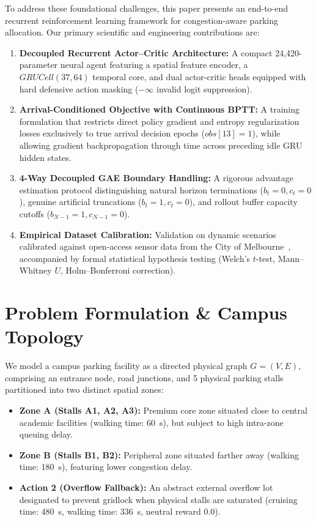 \documentclass[journal]{IEEEtran}
\begin{document}
To address these foundational challenges, this paper presents an end-to-end recurrent reinforcement learning framework for congestion-aware parking allocation. Our primary scientific and engineering contributions are:
\begin{enumerate}
    \item \textbf{Decoupled Recurrent Actor--Critic Architecture:} A compact 24,420-parameter neural agent featuring a spatial feature encoder, a $GRUCell(37, 64)$ temporal core, and dual actor-critic heads equipped with hard defensive action masking ($-\infty$ invalid logit suppression).
    \item \textbf{Arrival-Conditioned Objective with Continuous BPTT:} A training formulation that restricts direct policy gradient and entropy regularization losses exclusively to true arrival decision epochs ($obs[13] = 1$), while allowing gradient backpropagation through time across preceding idle GRU hidden states.
    \item \textbf{4-Way Decoupled GAE Boundary Handling:} A rigorous advantage estimation protocol distinguishing natural horizon terminations ($b_t=0, c_t=0$), genuine artificial truncations ($b_t=1, c_t=0$), and rollout buffer capacity cutoffs ($b_{N-1}=1, c_{N-1}=0$).
    \item \textbf{Empirical Dataset Calibration:} Validation on dynamic scenarios calibrated against open-access sensor data from the City of Melbourne~\cite{melbourne2024sensors}, accompanied by formal statistical hypothesis testing (Welch's $t$-test, Mann--Whitney $U$, Holm--Bonferroni correction).
\end{enumerate}

\section{Problem Formulation \& Campus Topology}
We model a campus parking facility as a directed physical graph $G = (V, E)$, comprising an entrance node, road junctions, and 5 physical parking stalls partitioned into two distinct spatial zones:
\begin{itemize}
    \item \textbf{Zone A (Stalls A1, A2, A3):} Premium core zone situated close to central academic facilities (walking time: 60~s), but subject to high intra-zone queuing delay.
    \item \textbf{Zone B (Stalls B1, B2):} Peripheral zone situated farther away (walking time: 180~s), featuring lower congestion delay.
    \item \textbf{Action 2 (Overflow Fallback):} An abstract external overflow lot designated to prevent gridlock when physical stalls are saturated (cruising time: 480~s, walking time: 336~s, neutral reward 0.0).
\end{itemize}
\end{document}
